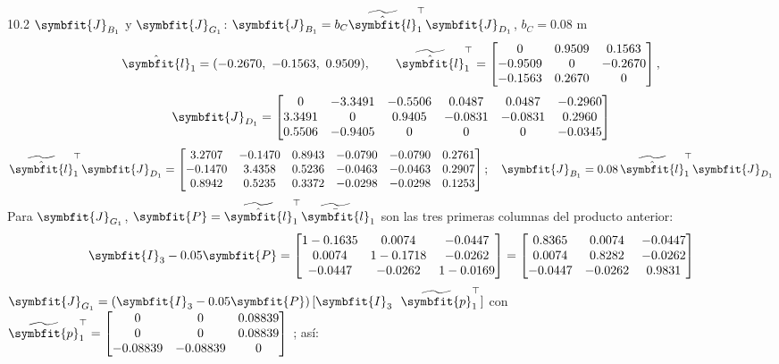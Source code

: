 \documentclass[11pt,a4paper]{article}
\makeatletter
\numberwithin{equation}{section}
\renewcommand\paragraph{\@startsection{paragraph}{4}{\z@}{1.4ex plus .4ex}{-0.6em}%
  {\normalfont\color{tinta}}}
\newcommand{\vect}[1]{\symbfit{#1}}
\newcommand{\T}{^{\top}}
\newcommand{\sk}[1]{\widetilde{#1}}
\makeatother
\begin{document}
\paragraph{10.2 $\vect J_{B_1}$ y $\vect J_{G_1}$:} $\vect J_{B_1} = b_C\sk{\hat{\vect l}}_1\T\vect J_{D_1}$, $b_C = 0.08$ m
\begin{equation*}
\hat{\vect l}_1 = (-0.2670,\ -0.1563,\ 0.9509),\qquad
\sk{\hat{\vect l}}_1\T = \begin{bmatrix}0 & 0.9509 & 0.1563\\ -0.9509 & 0 & -0.2670\\ -0.1563 & 0.2670 & 0\end{bmatrix},
\end{equation*}
\begin{equation*}
\vect J_{D_1} = \begin{bmatrix}
0 & -3.3491 & -0.5506 & 0.0487 & 0.0487 & -0.2960\\
3.3491 & 0 & 0.9405 & -0.0831 & -0.0831 & 0.2960\\
0.5506 & -0.9405 & 0 & 0 & 0 & -0.0345
\end{bmatrix}
\end{equation*}
\[
\sk{\hat{\vect l}}_1\T\vect J_{D_1} = \begin{bmatrix}
3.2707 & -0.1470 & 0.8943 & -0.0790 & -0.0790 & 0.2761\\
-0.1470 & 3.4358 & 0.5236 & -0.0463 & -0.0463 & 0.2907\\
0.8942 & 0.5235 & 0.3372 & -0.0298 & -0.0298 & 0.1253
\end{bmatrix} ;\quad \vect J_{B_1} = 0.08\,\sk{\hat{\vect l}}_1\T\vect J_{D_1}
\]
Para $\vect J_{G_1}$, $\vect P = \sk{\hat{\vect l}}_1\T\sk{\bar{\vect l}}_1$ son las tres primeras columnas del producto anterior:
{\small\[
\vect I_3 - 0.05\vect P = \begin{bmatrix}1 - 0.1635 & 0.0074 & -0.0447\\ 0.0074 & 1 - 0.1718 & -0.0262\\ -0.0447 & -0.0262 & 1 - 0.0169\end{bmatrix} = \begin{bmatrix}0.8365 & 0.0074 & -0.0447\\ 0.0074 & 0.8282 & -0.0262\\ -0.0447 & -0.0262 & 0.9831\end{bmatrix}
\]}
$\vect J_{G_1} = (\vect I_3 - 0.05\vect P)\,[\vect I_3\ \ \sk{\vect p}_1\T]$ con $\sk{\vect p}_1\T = \begin{bmatrix}0 & 0 & 0.08839\\ 0 & 0 & 0.08839\\ -0.08839 & -0.08839 & 0\end{bmatrix}$ ; así:
\end{document}
